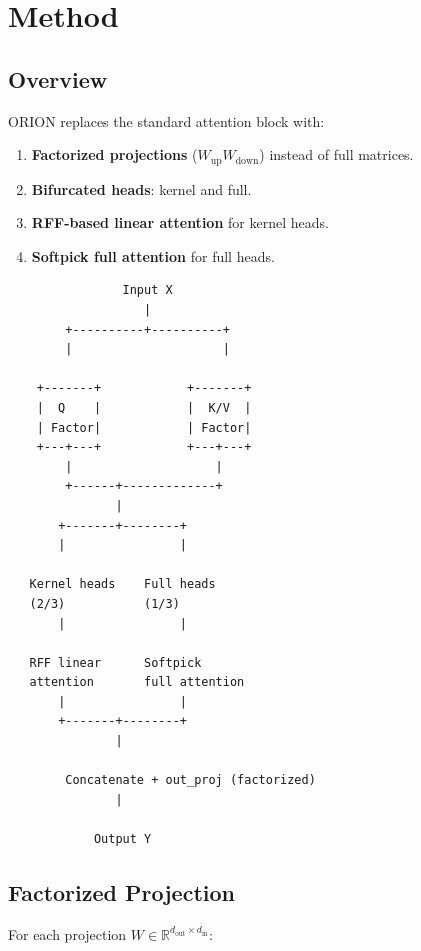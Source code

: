 
\section{Method}

\subsection{Overview}

ORION replaces the standard attention block with:

\begin{enumerate}
\item \textbf{Factorized projections} ($W_\text{up} W_\text{down}$) instead of full
  matrices.
\item \textbf{Bifurcated heads}: kernel and full.
\item \textbf{RFF-based linear attention} for kernel heads.
\item \textbf{Softpick full attention} for full heads.

\end{enumerate}
\begin{lstlisting}
                Input X
                   |
        +----------+----------+
        |                     |
                               
    +-------+            +-------+
    |  Q    |            |  K/V  |
    | Factor|            | Factor|
    +---+---+            +---+---+
        |                    |
        +------+-------------+
               |
       +-------+--------+
       |                |
                         
   Kernel heads    Full heads
   (2/3)           (1/3)
       |                |
                         
   RFF linear      Softpick
   attention       full attention
       |                |
       +-------+--------+
               |
                
        Concatenate + out_proj (factorized)
               |
                
            Output Y
\end{lstlisting}

\subsection{Factorized Projection}

For each projection $W \in \mathbb{R}^{d_\text{out} \times d_\text{in}}$:

